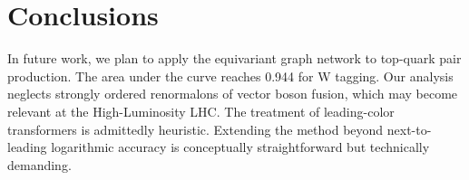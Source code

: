 \section{Conclusions}\label{sec:conclusions}

In future work, we plan to apply the equivariant graph network to
top-quark pair production. The area under the curve reaches 0.944 for W
tagging. Our analysis neglects strongly ordered renormalons of vector
boson fusion, which may become relevant at the High-Luminosity LHC. The
treatment of leading-color transformers is admittedly heuristic.
Extending the method beyond next-to-leading logarithmic accuracy is
conceptually straightforward but technically demanding.


